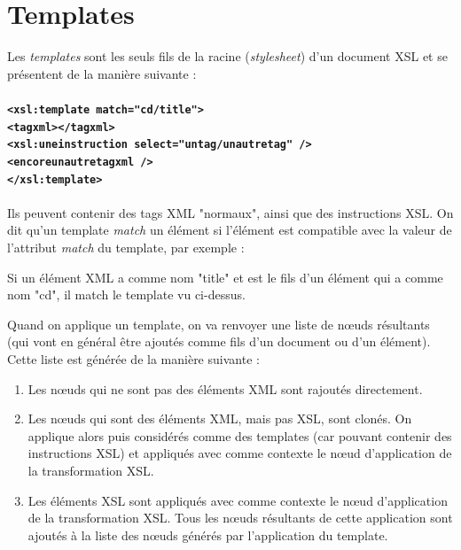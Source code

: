 \section{Templates}

Les \textit{templates} sont les seuls fils de la racine (\textit{stylesheet}) d'un document XSL et se présentent de la manière suivante :
\\
\\
\textbf{
\lstinline$<xsl:template match="cd/title">$\\
\indent \lstinline$<tagxml></tagxml>$\\
\indent \lstinline$<xsl:uneinstruction select="untag/unautretag" />$\\
\indent \lstinline$<encoreunautretagxml />$\\
\lstinline$</xsl:template>$
}
\\
\\
Ils peuvent contenir des tags XML "normaux", ainsi que des instructions XSL.
On dit qu'un template \textit{match} un élément si l'élément est compatible avec la valeur de l'attribut \textit{match} du template, par exemple :

Si un élément XML a comme nom "title" et est le fils d'un élément qui a comme nom "cd", il match le template vu ci-dessus.

Quand on applique un template, on va renvoyer une liste de nœuds résultants (qui vont en général être ajoutés comme fils d'un document ou d'un élément). Cette liste est générée de la manière suivante :\\

\begin{enumerate}
    \item Les nœuds qui ne sont pas des éléments XML sont rajoutés directement.
    \item Les nœuds qui sont des éléments XML, mais pas XSL, sont clonés. On applique alors  puis considérés comme des templates (car pouvant contenir des instructions XSL) et appliqués avec comme contexte le nœud d'application de la transformation XSL.
    \item Les éléments XSL sont appliqués avec comme contexte le nœud d'application de la transformation XSL. Tous les nœuds résultants de cette application sont ajoutés à la liste des nœuds générés par l'application du template.
\end{enumerate}
